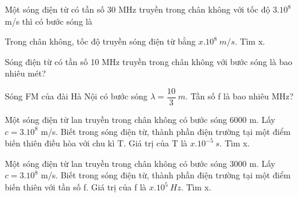 \setcounter{ex}{0}
\PhanIII
\begin{ex} %
 Một sóng điện từ có tần số 30 MHz truyền trong chân không với tốc độ $3.10^8$ m/s thì có bước sóng là
\end{ex} 
\begin{ex}
Trong chân không, tốc độ truyền sóng điện từ bằng $x.10^8\ m/s$. Tìm x.
\loigiai{}
\end{ex}
\begin{ex} %
 Sóng điện từ có tần số 10 MHz truyền trong chân không với bước sóng là bao nhiêu mét?
\end{ex} 
\begin{ex} %
Sóng FM của đài Hà Nội có bước sóng $\lambda =\dfrac{10}{3}\ m$. Tần số f là bao nhiêu MHz?
\end{ex} 
\begin{ex}%
 Một sóng điện từ lan truyền trong chân không có bước sóng 6000 m. Lấy $c=3.10^8$ m/s. Biết trong sóng điện từ, thành phần điện trường tại một điểm biến thiên điều hòa với chu kì T. Giá trị của T là $x.10^{-5}\ s$. Tìm x.
\end{ex} 
\begin{ex}%
 Một sóng điện từ lan truyền trong chân không có bước sóng 3000 m. Lấy $c = 3.10^8$ m/s. Biết trong sóng điện từ, thành phần điện trường tại một điểm biến thiên với tần số f. Giá trị của f là $x.10^5\ Hz$. Tìm x.
\end{ex} 
